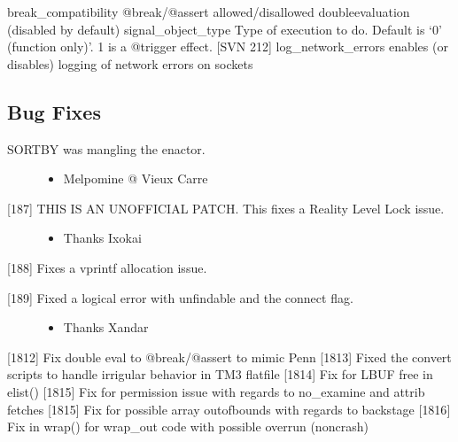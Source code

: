 \documentclass[letterpaper,10pt,english]{sphinxmanual}
\begin{document}
\sphinxAtStartPar
break\_compatibility \sphinxhyphen{} @break/@assert allowed/disallowed double\sphinxhyphen{}evaluation (disabled by default)
signal\_object\_type \sphinxhyphen{} Type of execution to do.  Default is ‘0’ (function only)’.  1 is a @trigger effect. {[}SVN 212{]}
log\_network\_errors      \sphinxhyphen{} enables (or disables) logging of network errors on sockets


\subsection{Bug Fixes}
\label{\detokenize{changelog:bug-fixes}}\begin{description}
\item[{SORTBY was mangling the enactor.}] \leavevmode\begin{itemize}
\item {} 
\sphinxAtStartPar
Melpomine @ Vieux Carre

\end{itemize}

\item[{{[}18\sphinxhyphen{}7{]} THIS IS AN UNOFFICIAL PATCH.  This fixes a Reality Level Lock issue.}] \leavevmode\begin{itemize}
\item {} 
\sphinxAtStartPar
Thanks Ixokai

\end{itemize}

\end{description}

\sphinxAtStartPar
{[}18\sphinxhyphen{}8{]} Fixes a vprintf allocation issue.
\begin{description}
\item[{{[}18\sphinxhyphen{}9{]} Fixed a logical error with unfindable and the connect flag.}] \leavevmode\begin{itemize}
\item {} 
\sphinxAtStartPar
Thanks Xandar

\end{itemize}

\end{description}

\sphinxAtStartPar
{[}18\sphinxhyphen{}12{]} Fix double eval to @break/@assert to mimic Penn
{[}18\sphinxhyphen{}13{]} Fixed the convert scripts to handle irrigular behavior in TM3 flatfile
{[}18\sphinxhyphen{}14{]} Fix for LBUF free in elist()
{[}18\sphinxhyphen{}15{]} Fix for permission issue with regards to no\_examine and attrib fetches
{[}18\sphinxhyphen{}15{]} Fix for possible array out\sphinxhyphen{}of\sphinxhyphen{}bounds with regards to backstage
{[}18\sphinxhyphen{}16{]} Fix in wrap() for wrap\_out code with possible overrun (non\sphinxhyphen{}crash)
\end{document}
